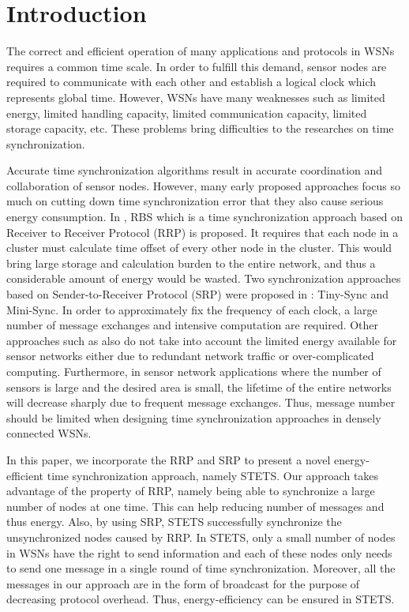 \documentclass[runningheads,a4paper]{llncs}
\begin{document}
\section{Introduction}
The correct and efficient operation of many applications and protocols \cite{1,2} in WSNs requires a common time scale. In order to fulfill this demand, sensor nodes are required to communicate with each other and establish a logical clock which represents global time. However, WSNs have many weaknesses such as limited energy, limited handling capacity, limited communication capacity, limited storage capacity, etc. These problems bring difficulties to the researches on time synchronization.

Accurate time synchronization algorithms result in accurate coordination and collaboration of sensor nodes. However, many early proposed approaches focus so much on cutting down time synchronization error that they also cause serious energy consumption. In \cite{3}, RBS which is a time synchronization approach based on Receiver to Receiver Protocol (RRP) is proposed. It requires that each node in a cluster must calculate time offset of every other node in the cluster. This would bring large storage and calculation burden to the entire network, and thus a considerable amount of energy would be wasted. Two synchronization approaches based on Sender-to-Receiver Protocol (SRP) were proposed in \cite{4}: Tiny-Sync and Mini-Sync. In order to approximately fix the frequency of each clock, a large number of message exchanges and intensive computation are required. Other approaches such as \cite{5,6,7} also do not take into account the limited energy available for sensor networks either due to redundant network traffic or over-complicated computing. Furthermore, in sensor network applications where the number of sensors is large and the desired area is small, the lifetime of the entire networks will decrease sharply due to frequent message exchanges. Thus, message number should be limited when designing time synchronization approaches in densely connected WSNs.

In this paper, we incorporate the RRP and SRP to present a novel energy-efficient time synchronization approach, namely STETS. Our approach takes advantage of the property of RRP, namely being able to synchronize a large number of nodes at one time. This can help reducing number of messages and thus energy. Also, by using SRP, STETS successfully synchronize the unsynchronized nodes caused by RRP. In STETS, only a small number of nodes in WSNs have the right to send information and each of these nodes only needs to send one message in a single round of time synchronization. Moreover, all the messages in our approach are in the form of broadcast for the purpose of decreasing protocol overhead. Thus, energy-efficiency can be ensured in STETS.
\end{document}
